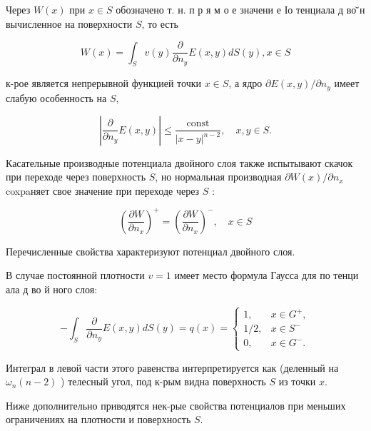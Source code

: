 \documentclass[10pt]{article}
\begin{document}
Через $W(x)$ при $x \in S$ обозначено т. н. п р я м о е значени е Іо тенциала д во ̆̈н вычисленное на поверхности $S$, то есть



\[

W(x)=\int_{S} v(y) \frac{\partial}{\partial n_{y}} E(x, y) d S(y), x \in S

\]



к-рое является непрерывной функцией точки $x \in S$, а ядро $\partial E(x, y) / \partial n_{y}$ имеет слабую особенность на $S$,



\[

\left|\frac{\partial}{\partial n_{y}} E(x, y)\right| \leqslant \frac{\text { const }}{|x-y|^{n-2}}, \quad x, y \in S .

\]



Касательные производные потенциала двойного слоя также испытывают скачок при переходе через поверхность $S$, но нормальная производная $\partial W(x) / \partial n_{x}$ coxpaняет свое значение при переходе через $S$ :



\[

\left(\frac{\partial W}{\partial n_{x}}\right)^{+}=\left(\frac{\partial W}{\partial n_{x}}\right)^{-}, \quad x \in S

\]



Перечисленные свойства характеризуют потенциал двойного слоя.



В случае постоянной плотности $v=1$ имеет место формула Гаусса для по тенци ала д во й ного слоя:



\[

-\int_{S} \frac{\partial}{\partial n_{y}} E(x, y) d S(y)=q(x)= \begin{cases}1, & x \in G^{+}, \\ 1 / 2, & x \in S^{-} \\ 0, & x \in G^{-} .\end{cases}

\]



Интеграл в левой части этого равенства интерпретируется как (деленный на $\omega_{n}(n-2)$ ) телесный угол, под к-рым видна поверхность $S$ из точки $x$.



Ниже дополнительно приводятся нек-рые свойства потенциалов при меньших ограничениях на плотности и поверхность $S$.
\end{document}
